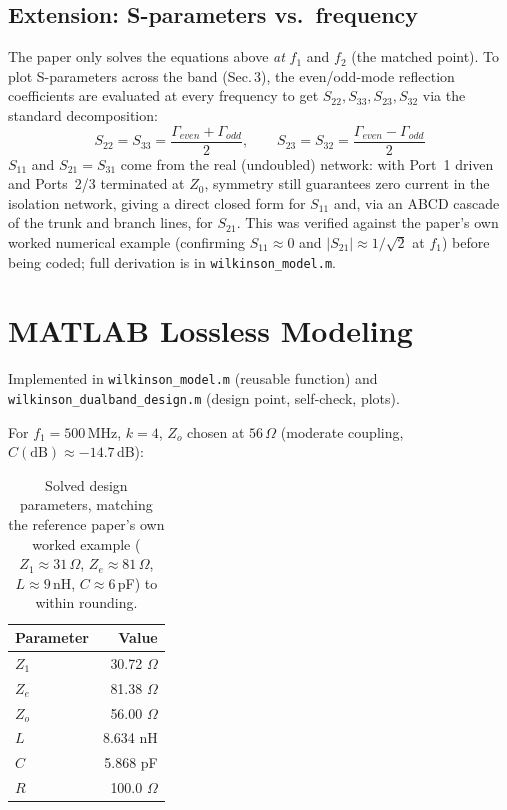 \documentclass[11pt]{article}
\begin{document}
\subsection{Extension: S-parameters vs.\ frequency}
The paper only solves the equations above \emph{at} $f_1$ and $f_2$ (the matched
point). To plot S-parameters across the band (Sec.\,3), the even/odd-mode reflection
coefficients are evaluated at every frequency to get $S_{22},S_{33},S_{23},S_{32}$ via
the standard decomposition:
\begin{equation}
S_{22}=S_{33}=\frac{\Gamma_{even}+\Gamma_{odd}}{2}, \qquad
S_{23}=S_{32}=\frac{\Gamma_{even}-\Gamma_{odd}}{2}
\end{equation}
$S_{11}$ and $S_{21}=S_{31}$ come from the real (undoubled) network: with Port~1
driven and Ports~2/3 terminated at $Z_0$, symmetry still guarantees zero current in
the isolation network, giving a direct closed form for $S_{11}$ and, via an ABCD
cascade of the trunk and branch lines, for $S_{21}$. This was verified against the
paper's own worked numerical example (confirming $S_{11}\approx 0$ and
$|S_{21}|\approx 1/\sqrt{2}$ at $f_1$) before being coded; full derivation is in
\texttt{wilkinson\_model.m}.

\section{MATLAB Lossless Modeling}
Implemented in \texttt{wilkinson\_model.m} (reusable function) and
\texttt{wilkinson\_dualband\_design.m} (design point, self-check, plots).

For $f_1=500$\,MHz, $k=4$, $Z_o$ chosen at $56\,\Omega$ (moderate coupling,
$C(\mathrm{dB})\approx-14.7$\,dB):

\begin{table}[h]
\centering
\begin{tabular}{@{}lr@{}}
\toprule
\textbf{Parameter} & \textbf{Value} \\
\midrule
$Z_1$ & 30.72 $\Omega$ \\
$Z_e$ & 81.38 $\Omega$ \\
$Z_o$ & 56.00 $\Omega$ \\
$L$   & 8.634 nH \\
$C$   & 5.868 pF \\
$R$   & 100.0 $\Omega$ \\
\bottomrule
\end{tabular}
\caption{Solved design parameters, matching the reference paper's own worked example
($Z_1\approx31\,\Omega$, $Z_e\approx81\,\Omega$, $L\approx9$\,nH, $C\approx6$\,pF) to
within rounding.}
\end{table}
\end{document}
